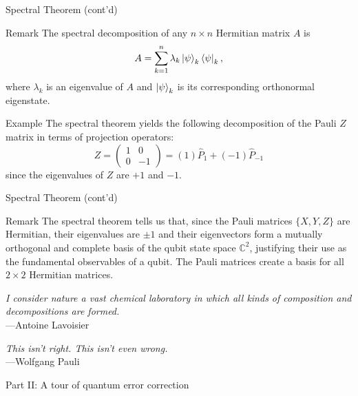 \documentclass{beamer}
\newcommand{\C}{\mathbb{C}}
\begin{document}
\begin{frame}{Spectral Theorem (cont'd)}

\begin{block}{Remark}
    The spectral decomposition of any $n \times n$ Hermitian matrix $A$ is
    $$ A = \sum_{k=1}^n\lambda_k \ket{\psi}_k\bra{\psi}_k , $$
    where $\lambda_k$ is an eigenvalue of $A$ and $\ket{\psi}_k$ is its corresponding orthonormal eigenstate.
\end{block}

\begin{block}{Example}
    The spectral theorem yields the following decomposition of the Pauli $Z$ matrix in terms of projection operators:
    $$ Z = \begin{pmatrix}
        1 & 0 \\ 0 & -1
    \end{pmatrix} = (1)\hat{P}_1 + (-1)\hat{P}_{-1} $$ since the eigenvalues of $Z$ are $+1$ and $-1$.
\end{block}
\end{frame}
\begin{frame}{Spectral Theorem (cont'd)}

\begin{block}{Remark}
The spectral theorem tells us that, since the Pauli matrices $\{X,Y,Z\}$ are Hermitian, their eigenvalues are $\pm 1$ and their eigenvectors form a mutually orthogonal and complete basis of the qubit state space $\C^2$, justifying their use as the fundamental observables of a qubit. The Pauli matrices create a basis for all $2\times2$ Hermitian matrices.
\end{block}



\begin{flushright}
    \textit{I consider nature a vast chemical laboratory in which all kinds of composition and decompositions are formed.}\\---Antoine Lavoisier
\end{flushright}

\begin{flushright}
    \textit{This isn't right. This isn't even wrong.}\\---Wolfgang Pauli
\end{flushright}


\end{frame}

\begin{frame}{Part II: A tour of quantum error correction}

\end{frame}
\end{document}
